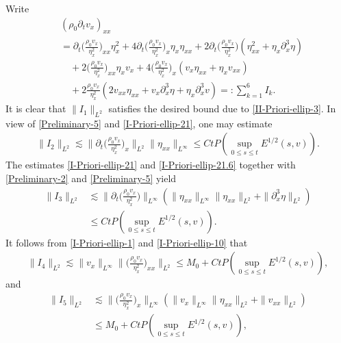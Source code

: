 \documentclass[11pt, reqno]{amsart}
\numberwithin{equation}{section}
\begin{document}
Write
\begin{equation*}
\begin{aligned}
&(\rho_0\partial_tv_x)_{xx}\\
&=\partial_t\bigg({\frac{\rho_0v_x}{\eta_x^2}}\bigg)_{xx}\eta_x^2
+4\partial_t\bigg(\frac{\rho_0v_x}{\eta_x^2}\bigg)_{x}\eta_{x}\eta_{xx}
+2\partial_t\bigg(\frac{\rho_0v_x}{\eta_x^2}\bigg)(\eta_{xx}^2+\eta_{x}\partial_x^3\eta)\\
&\quad+2\bigg({\frac{\rho_0v_x}{\eta_x^2}}\bigg)_{xx}\eta_xv_x
+4\bigg(\frac{\rho_0v_x}{\eta_x^2}\bigg)_{x}(v_x\eta_{xx}+\eta_{x}v_{xx})\\
&\quad+2\frac{\rho_0v_x}{\eta_x^2}(2v_{xx}\eta_{xx}+v_x\partial_x^3\eta+\eta_{x}\partial_x^3v)=\colon \sum_{k=1}^6I_k.
\end{aligned}
\end{equation*}
It is clear that \(\|I_1\|_{L^2}\) satisfies the desired bound due to \eqref{II-Priori-ellip-3}.
In view of \eqref{Preliminary-5} and \eqref{I-Priori-ellip-21}, one may estimate
\begin{equation*}
\begin{aligned}
\|I_2\|_{L^2}
\lesssim
\bigg\|\partial_t\bigg(\frac{\rho_0v_x}{\eta_x^2}\bigg)_x\bigg\|_{L^2}
\|\eta_{xx}\|_{L^\infty}
\leq Ct P(\sup_{0\leq s\leq t}E^{1/2}(s,v)).
\end{aligned}
\end{equation*}
The estimates  \eqref{I-Priori-ellip-21} and \eqref{I-Priori-ellip-21.6} together with \eqref{Preliminary-2} and
\eqref{Preliminary-5} yield
\begin{equation*}
\begin{aligned}
\|I_3\|_{L^2}
&\lesssim
\bigg\|\partial_t\bigg(\frac{\rho_0v_x}{\eta_x^2}\bigg)\bigg\|_{L^\infty}(\|\eta_{xx}\|_{L^\infty}\|\eta_{xx}\|_{L^2}
+\|\partial_x^3\eta\|_{L^2})\\
&\leq Ct P(\sup_{0\leq s\leq t}E^{1/2}(s,v)).
\end{aligned}
\end{equation*}
It follows from \eqref{I-Priori-ellip-1} and \eqref{I-Priori-ellip-10} that
\begin{equation*}
\begin{aligned}
\|I_4\|_{L^2}\lesssim
\|v_{x}\|_{L^\infty}\bigg\|\bigg(\frac{\rho_0v_x}{\eta_x^2}\bigg)_{xx}\bigg\|_{L^2}
\leq M_0+Ct P(\sup_{0\leq s\leq t}E^{1/2}(s,v)),
\end{aligned}
\end{equation*}
and
\begin{equation*}
\begin{aligned}
\|I_5\|_{L^2}&\lesssim
\bigg\|\bigg(\frac{\rho_0v_x}{\eta_x^2}\bigg)_{x}\bigg\|_{L^\infty}(\|v_{x}\|_{L^\infty}\|\eta_{xx}\|_{L^2}
+\|v_{xx}\|_{L^2})\\
&\leq M_0+Ct P(\sup_{0\leq s\leq t}E^{1/2}(s,v)),
\end{aligned}
\end{equation*}
\end{document}
